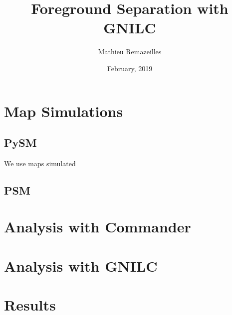 \documentclass[12pt]{article}
\begin{document}
\title{Foreground Separation with GNILC}
\author{Mathieu Remazeilles} 
\date{February, 2019} 
\maketitle



\section{Map Simulations}
\label{sec:simulations}

\subsection{PySM}

We use maps simulated

\subsection{PSM}

\section{Analysis with Commander}

\section{Analysis with GNILC}

\section{Results}
\end{document}
